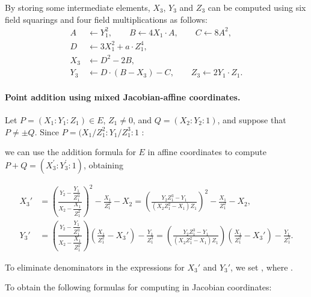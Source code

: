By storing some intermediate elements, $X_3$, $Y_3$ and $Z_3$ can be computed using
six field squarings and four field multiplications as follows:
\begin{equation}
	\begin{aligned}
		A &\leftarrow Y_1^2,            \qquad
		B \leftarrow 4X_1 \cdot A,     \qquad
		C \leftarrow 8A^2,             \\
		D &\leftarrow 3X_1^2 + a \cdot Z_1^4,                      \\
		X_3 &\leftarrow D^2 - 2B,                                   \\
		Y_3 &\leftarrow D \cdot (B - X_3) - C, \qquad
		Z_3 \leftarrow 2Y_1 \cdot Z_1.
	\end{aligned}
	\label{eq:ch3.jacobianDoublingSteps}
\end{equation}

\paragraph{Point addition using mixed Jacobian-affine coordinates.}
Let $P = (X_1 : Y_1 : Z_1) \in E$, $Z_1 \neq 0$, and $Q = (X_2 : Y_2 : 1)$,
and suppose that $P \neq \pm Q$. Since $P = (X_1/Z_1^2 : Y_1/Z_1^3 : 1$ :

we can use the addition formula for $E$ in affine coordinates to compute $P + Q =
(X_3^{'} : Y_3^{'} : 1)$, obtaining

\begin{align}
	X_3' &= \left(
	\frac{Y_2 - \dfrac{Y_1}{Z_1^3}}{X_2 - \dfrac{X_1}{Z_1^2}}
	\right)^2 - \frac{X_1}{Z_1^2} - X_2
	= \left(
	\frac{Y_2 Z_1^3 - Y_1}{(X_2 Z_1^2 - X_1)Z_1}
	\right)^2 - \frac{X_1}{Z_1^2} - X_2,
	\label{eq:ch3.mixedX3prime} \\[10pt]
	Y_3' &= \left(
	\frac{Y_2 - \dfrac{Y_1}{Z_1^3}}{X_2 - \dfrac{X_1}{Z_1^2}}
	\right)\left(
	\frac{X_1}{Z_1^2} - X_3'
	\right) - \frac{Y_1}{Z_1^3}
	= \left(
	\frac{Y_2 Z_1^3 - Y_1}{(X_2 Z_1^2 - X_1)Z_1}
	\right)\left(
	\frac{X_1}{Z_1^2} - X_3'
	\right) - \frac{Y_1}{Z_1^3}.
	\label{eq:ch3.mixedY3prime}
\end{align}


To eliminate denominators in the expressions for $X_3'$ and $Y_3'$, we set
,
where . 

To obtain the following formulas for computing 
in Jacobian coordinates:


